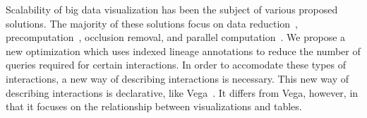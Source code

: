 Scalability of big data visualization has been the subject of various proposed solutions.
The majority of these solutions focus on data reduction~\cite{Liu2013}, precomputation~\cite{Liu2013}, occlusion removal, and parallel computation~\cite{Liu2013}.
We propose a new optimization which uses indexed lineage annotations to reduce the number of queries required for certain interactions.
In order to accomodate these types of interactions, a new way of describing interactions is necessary.
This new way of describing interactions is declarative, like Vega~\cite{Satyanarayan}.
It differs from Vega, however, in that it focuses on the relationship between visualizations and tables.